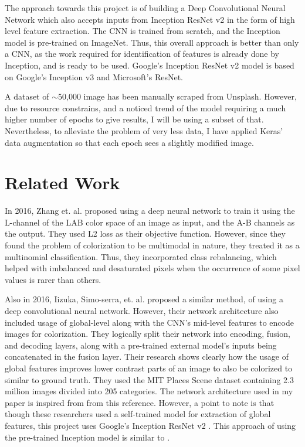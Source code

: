 \documentclass[10pt,twocolumn,letterpaper]{article}
\begin{document}
	The approach towards this project is of building a Deep Convolutional Neural Network which also accepts inputs from Inception ResNet v2 in the form of high level feature extraction. The CNN is trained from scratch, and the Inception model is pre-trained on ImageNet. Thus, this overall approach is better than only a CNN, as the work required for identification of features is already done by Inception, and is ready to be used. Google's Inception ResNet v2 model is based on Google's Inception v3 and Microsoft's ResNet.

	A dataset of $\sim$50,000 image has been manually scraped from Unsplash. However, due to resource constrains, and a noticed trend of the model requiring a much higher number of epochs to give results, I will be using a subset of that. Nevertheless, to alleviate the problem of very less data, I have applied Keras' data augmentation so that each epoch sees a slightly modified image.

	\section{Related Work}
	In 2016, Zhang et. al. \cite{Zhang1} proposed using a deep neural network to train it using the L-channel of the LAB color space \cite{LabColorSpace} of an image as input, and the A-B channels as the output. They used L2 loss as their objective function. However, since they found the problem of colorization to be multimodal in nature, they treated it as a multinomial classification. Thus, they incorporated class rebalancing, which helped with imbalanced and desaturated pixels when the occurrence of some pixel values is rarer than others.

	Also in 2016, Iizuka, Simo-serra, et. al. \cite{Iizuka} proposed a similar method, of using a deep convolutional neural network. However, their network architecture also included usage of global-level along with the CNN's mid-level features to encode images for colorization. They logically split their network into encoding, fusion, and decoding layers, along with a pre-trained external model's inputs being concatenated in the fusion layer. Their research shows clearly how the usage of global features improves lower contrast parts of an image to also be colorized to similar to ground truth. They used the MIT Places Scene dataset containing 2.3 million images divided into 205 categories. The network architecture used in my paper is inspired from from this reference. However, a point to note is that though these researchers used a self-trained model for extraction of global features, this project uses Google's Inception ResNet v2 \cite{Inception}. This approach of using the pre-trained Inception model is similar to \cite{Koalarization}.
\end{document}
